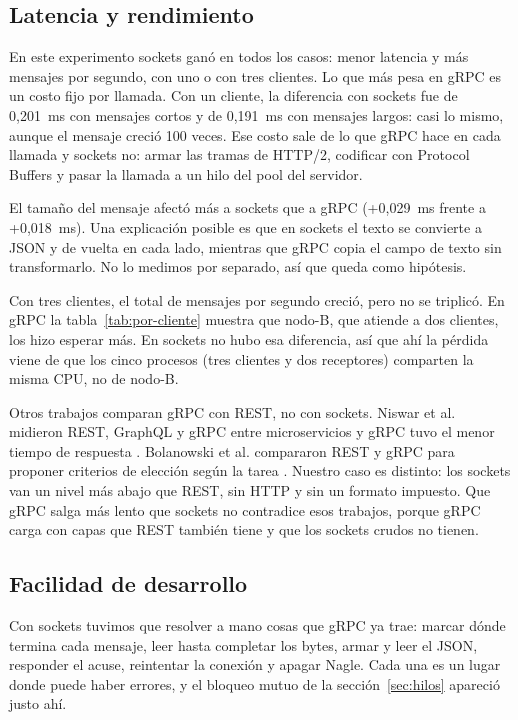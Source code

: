 \documentclass[11pt,a4paper]{article}
\begin{document}
\subsection{Latencia y rendimiento}

En este experimento sockets ganó en todos los casos: menor latencia y más mensajes por segundo, con uno o con tres clientes. Lo que más pesa en gRPC es un costo fijo por llamada. Con un cliente, la diferencia con sockets fue de 0,201~ms con mensajes cortos y de 0,191~ms con mensajes largos: casi lo mismo, aunque el mensaje creció 100 veces. Ese costo sale de lo que gRPC hace en cada llamada y sockets no: armar las tramas de HTTP/2, codificar con Protocol Buffers y pasar la llamada a un hilo del pool del servidor.

El tamaño del mensaje afectó más a sockets que a gRPC (+0,029~ms frente a +0,018~ms). Una explicación posible es que en sockets el texto se convierte a JSON y de vuelta en cada lado, mientras que gRPC copia el campo de texto sin transformarlo. No lo medimos por separado, así que queda como hipótesis.

Con tres clientes, el total de mensajes por segundo creció, pero no se triplicó. En gRPC la tabla~\ref{tab:por-cliente} muestra que nodo-B, que atiende a dos clientes, los hizo esperar más. En sockets no hubo esa diferencia, así que ahí la pérdida viene de que los cinco procesos (tres clientes y dos receptores) comparten la misma CPU, no de nodo-B.

Otros trabajos comparan gRPC con REST, no con sockets. Niswar et al. midieron REST, GraphQL y gRPC entre microservicios y gRPC tuvo el menor tiempo de respuesta \cite{niswar2024}. Bolanowski et al. compararon REST y gRPC para proponer criterios de elección según la tarea \cite{bolanowski2022}. Nuestro caso es distinto: los sockets van un nivel más abajo que REST, sin HTTP y sin un formato impuesto. Que gRPC salga más lento que sockets no contradice esos trabajos, porque gRPC carga con capas que REST también tiene y que los sockets crudos no tienen.

\subsection{Facilidad de desarrollo}

Con sockets tuvimos que resolver a mano cosas que gRPC ya trae: marcar dónde termina cada mensaje, leer hasta completar los bytes, armar y leer el JSON, responder el acuse, reintentar la conexión y apagar Nagle. Cada una es un lugar donde puede haber errores, y el bloqueo mutuo de la sección~\ref{sec:hilos} apareció justo ahí.
\end{document}
